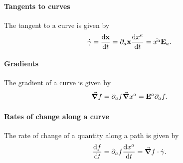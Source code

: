 \paragraph{Tangents to curves}
The tangent to a curve is given by
\begin{align*}
	\dot{\vb{\gamma}} = \dv{\vb{x}}{t} = \partial_{a}\vb{x}\dv{x^{a}}{t} = \dot{x^{a}}\vb{E}_{a}.
\end{align*}

\paragraph{Gradients}
The gradient of a curve is given by
\begin{align*}
	\grad{f} = \partial_{a}f\grad{x^{a}} = \vb{E}^{a}\partial_{a}f.
\end{align*}

\paragraph{Rates of change along a curve}
The rate of change of a quantity along a path is given by
\begin{align*}
	\dv{f}{t} = \partial_{a}f\dv{x^{a}}{t} = \grad{f}\cdot\dot{\vb{\gamma}}.
\end{align*}